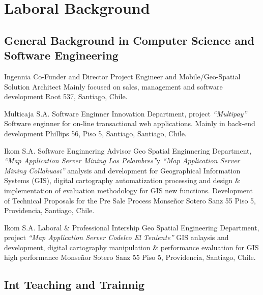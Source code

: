 \documentclass[11pt,letterpaper,roman]{moderncv}
\begin{document}
\section{Laboral Background}

\subsection{General Background in Computer Science and Software Engineering}
	{Ingennia} %
	{Co-Funder and Director} %
	{Project Engineer and Mobile/Geo-Spatial Solution Architect}
	{Mainly focused on sales, management and software development}
	{Root 537, Santiago, Chile.}
	

	{Multicaja S.A.} %
	{Software Enginner} %
	{Innovation Department, project \textit{``Multipay''}}
	{Software enginner for on-line transactional web applications. Mainly in back-end development}
	{Phillips 56, Piso 5, Santiago, Santiago, Chile.}

	{Ikom S.A.}	%
	{Software Enginnering Advisor}
	{Geo Spatial Enginnering Department,
	\textit{``Map Application Server Mining Los Pelambres''}y \textit{``Map Application Server Mining 
	Collahuasi''}}
	{analysis and development for Geographical Information Systems (GIS),
digital cartography automatization processing and design \& implementation of
evaluation methodology for GIS new functions. Development of Technical Proposals
for the Pre Sale Process} 
	{Monse\~nor Sotero Sanz 55 Piso 5, Providencia, Santiago, Chile.}
	

	{Ikom S.A.}	%
	{Laboral \& Professional Intership} %
	{Geo Spatial Engineering Department, project 
	\textit{``Map Application Server Codelco El Teniente''}}
	{GIS anlaysis and development, digital cartography manipulation \&
performance evaluation for GIS high performance}
	{Monse\~nor Sotero Sanz 55 Piso 5, Providencia, Santiago, Chile.}
	
	

\subsection{Int Teaching and Trainnig}
	
\end{document}
